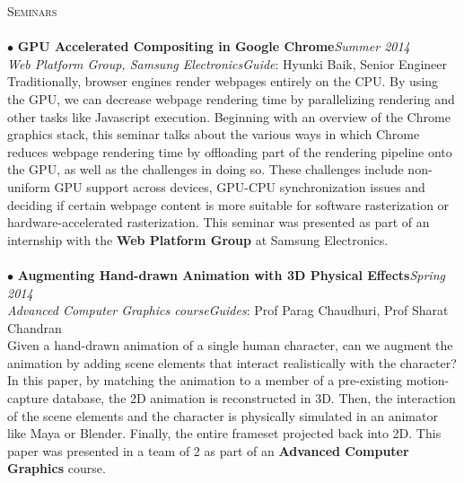 \documentclass[a4paper,9pt]{article}
\begin{document}

\textcolor{myrust}{\large{\textsc{Seminars}}}\textcolor{mygray}{\sout{\hfill}}\\\\
\normalsize
$\bullet$ \textbf{GPU Accelerated Compositing in Google Chrome}\hfill\textit{Summer 2014}\\
\textcolor{mydarkgray}{\textit{Web Platform Group, Samsung Electronics}}\hfill\textit{Guide}: \textcolor{mydarkgray}{Hyunki Baik, Senior Engineer}\\
Traditionally, browser engines render webpages entirely on the CPU. By using the GPU, we can decrease webpage rendering time by parallelizing rendering and other tasks like Javascript execution. Beginning with an overview of the Chrome graphics stack, this seminar talks about the various ways in which Chrome reduces webpage rendering time by offloading part of the rendering pipeline onto the GPU, as well as the challenges in doing so. These challenges include non-uniform GPU support across devices, GPU-CPU synchronization issues and deciding if certain webpage content is more suitable for software rasterization or hardware-accelerated rasterization. This seminar was presented as part of an internship with the \textbf{Web Platform Group} at Samsung Electronics.\\\\
$\bullet$ \textbf{Augmenting Hand-drawn Animation with 3D Physical Effects}\hfill\textit{Spring 2014}\\
\textcolor{mydarkgray}{\textit{Advanced Computer Graphics course}}\hfill\textit{Guides}: \textcolor{mydarkgray}{Prof Parag Chaudhuri, Prof Sharat Chandran}\\
Given a hand-drawn animation of a single human character, can we augment the animation by adding scene elements that interact realistically with the character? In this paper, by matching the animation to a member of a pre-existing motion-capture database, the 2D animation is reconstructed in 3D. Then, the interaction of the scene elements and the character is physically simulated in an animator like Maya or Blender. Finally, the entire frameset projected back into 2D. This paper was presented in a team of 2 as part of an \textbf{Advanced Computer Graphics} course.\\\\
\end{document}
